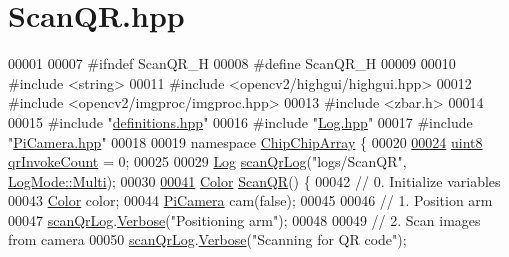 \hypertarget{ScanQR_8hpp_source}{\section{Scan\+Q\+R.\+hpp}
\label{ScanQR_8hpp_source}
}

\begin{DoxyCode}
00001 
00007 \textcolor{preprocessor}{#ifndef ScanQR\_H}
00008 \textcolor{preprocessor}{#define ScanQR\_H}
00009 
00010 \textcolor{preprocessor}{#include <string>}
00011 \textcolor{preprocessor}{#include <opencv2/highgui/highgui.hpp>}
00012 \textcolor{preprocessor}{#include <opencv2/imgproc/imgproc.hpp>}
00013 \textcolor{preprocessor}{#include <zbar.h>}
00014 
00015 \textcolor{preprocessor}{#include "\hyperlink{definitions_8hpp}{definitions.hpp}"}
00016 \textcolor{preprocessor}{#include "\hyperlink{Log_8hpp}{Log.hpp}"}
00017 \textcolor{preprocessor}{#include "\hyperlink{PiCamera_8hpp}{PiCamera.hpp}"}
00018 
00019 \textcolor{keyword}{namespace }\hyperlink{namespaceChipChipArray}{ChipChipArray} \{
00020 
\hypertarget{ScanQR_8hpp_source_l00024}{}\hyperlink{namespaceChipChipArray_a3b2a3c0ffa9f53021293aeb4955d2fef}{00024}     \hyperlink{definitions_8hpp_adde6aaee8457bee49c2a92621fe22b79}{uint8} \hyperlink{namespaceChipChipArray_a3b2a3c0ffa9f53021293aeb4955d2fef}{qrInvokeCount} = 0;
00025     
00029     \hyperlink{classChipChipArray_1_1Log}{Log} \hyperlink{namespaceChipChipArray_ab5c6290951637c25a5422707020fb3a8}{scanQrLog}(\textcolor{stringliteral}{"logs/ScanQR"}, \hyperlink{definitions_8hpp_aa7380b6d694cab49f07aed6a7af592d9ace7898536dd0e928d1640ee2ad531cc8}{LogMode::Multi});
00030 
\hypertarget{ScanQR_8hpp_source_l00041}{}\hyperlink{namespaceChipChipArray_a6c7465049b5d408e1a238b6d8ffa887d}{00041}     \hyperlink{definitions_8hpp_abc05a0f46084a3477cf5d5c939ff1436}{Color} \hyperlink{namespaceChipChipArray_a6c7465049b5d408e1a238b6d8ffa887d}{ScanQR}() \{
00042         \textcolor{comment}{// 0. Initialize variables}
00043         \hyperlink{definitions_8hpp_abc05a0f46084a3477cf5d5c939ff1436}{Color} color;
00044         \hyperlink{classChipChipArray_1_1PiCamera}{PiCamera} cam(\textcolor{keyword}{false});
00045 
00046         \textcolor{comment}{// 1. Position arm}
00047         \hyperlink{namespaceChipChipArray_ab5c6290951637c25a5422707020fb3a8}{scanQrLog}.\hyperlink{classChipChipArray_1_1Log_a154a5f38d9c7a767693b242684a3d4d9}{Verbose}(\textcolor{stringliteral}{"Positioning arm"});
00048 
00049         \textcolor{comment}{// 2. Scan images from camera}
00050         \hyperlink{namespaceChipChipArray_ab5c6290951637c25a5422707020fb3a8}{scanQrLog}.\hyperlink{classChipChipArray_1_1Log_a154a5f38d9c7a767693b242684a3d4d9}{Verbose}(\textcolor{stringliteral}{"Scanning for QR code"});

\end{DoxyCode}
